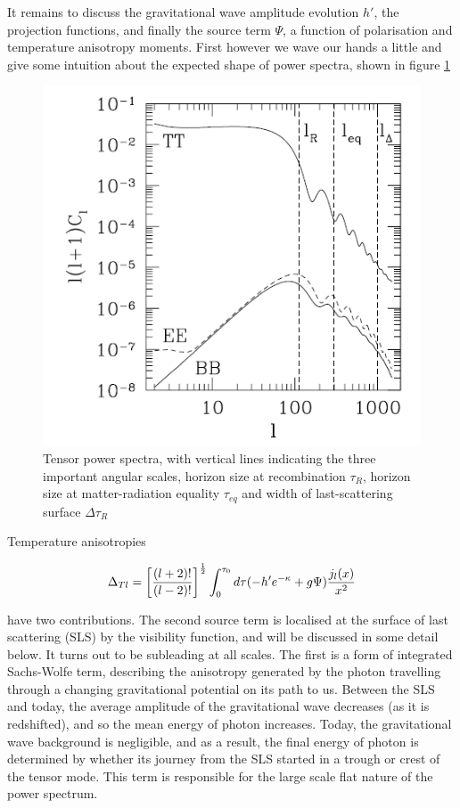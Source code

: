 \documentclass[a4paper,10pt]{article}
\newcommand{\half}{\frac{1}{2}}
\newcommand{\ltwo}{\left[\frac{(l+2)!}{(l-2)!}\right]}
\begin{document}
It remains to discuss the gravitational wave amplitude evolution $h'$, the projection functions, and finally the source term $\Psi$, a function of polarisation and temperature anisotropy moments. First however we wave our hands a little and give some intuition about the expected shape of power spectra, shown in figure \ref{tensorpower}

\begin{figure}[h]
  \includegraphics[width=0.5\linewidth]{tensorpowerspectra.png}
  \centering
  \caption{Tensor power spectra, with vertical lines indicating the three important angular scales, horizon size at recombination $\tau_R$, horizon size at matter-radiation equality $\tau_{eq}$ and width of last-scattering surface $\Delta\tau_R$}
  \label{tensorpower}
\end{figure}


Temperature anisotropies 

\begin{equation}
\Delta_{Tl} = \ltwo^\half \int_0^{\tau_0} d\tau (-h'e^{-\kappa}+g\Psi)\frac{j_l(x)}{x^2}\\
\end{equation}

have two contributions. The second source term is localised at the surface of last scattering (SLS) by the visibility function, and will be discussed in some detail below. It turns out to be subleading at all scales. The first is a form of integrated Sachs-Wolfe term, describing the anisotropy generated by the photon travelling through a changing gravitational potential on its path to us. Between the SLS and today, the average amplitude of the gravitational wave decreases (as it is redshifted), and so the mean energy of photon increases. Today, the gravitational wave background is negligible, and as a result, the final energy of photon is determined by whether its journey from the SLS started in a trough or crest of the tensor mode. This term is responsible for the large scale flat nature of the power spectrum.\\
\end{document}

